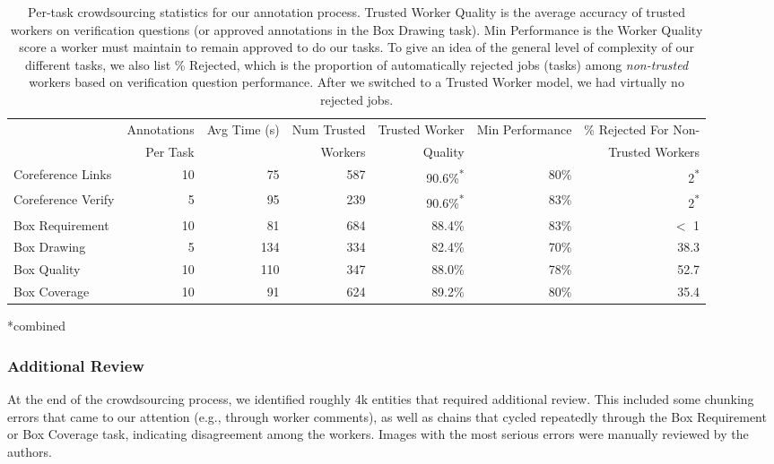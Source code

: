 \documentclass[twocolumn]{svjour3}
\begin{document}
\begin{table*}
\caption{Per-task crowdsourcing statistics for our annotation process.  Trusted Worker Quality is the average accuracy of trusted workers on verification questions (or approved annotations in the Box Drawing task). Min Performance is the Worker Quality score a worker must maintain to remain approved to do our tasks. To give an idea of the general level of complexity of our different tasks, we also list \% Rejected, which is the proportion of automatically rejected jobs (tasks) among {\em non-trusted} workers based on verification question performance. After we switched to a Trusted Worker model, we had virtually no rejected jobs.}
\label{table:annoStats}
\small
\begin{center}
\begin{tabular}{|l|r|r|r|r|r|r|}
\hline
& Annotations& \multirow{2}{*}{Avg Time (s)} & Num Trusted & Trusted Worker & \multirow{2}{*}{Min Performance} & \% Rejected For Non-\\
& Per Task & & Workers  & Quality & & Trusted Workers\\
\hline
Coreference Links & 10 & 75 & 587 & 90.6\%\textsuperscript{*} & 80\% & 2\textsuperscript{*}\\
Coreference Verify & 5 & 95 & 239 & 90.6\%\textsuperscript{*} & 83\% & 2\textsuperscript{*}\\
Box Requirement & 10 & 81 & 684 & 88.4\% & 83\% & $<$ 1\\
Box Drawing & 5 & 134 & 334 & 82.4\% & 70\% & 38.3\\
Box Quality & 10 & 110 & 347 & 88.0\% & 78\% & 52.7\\
Box Coverage & 10 & 91 & 624 & 89.2\% & 80\% & 35.4\\
\hline
\end{tabular}
\vspace{-1.5mm}
\flushleft\hspace{5mm}\begingroup
    \fontsize{6pt}{6pt}\selectfont
 *combined
\endgroup
\vspace{-3mm}
\end{center}
\end{table*}

\subsubsection{Additional Review}
At the end of the crowdsourcing process, we identified roughly 4k entities that required additional review. This included some chunking errors that came to our attention (e.g., through worker comments), as well as chains that cycled repeatedly through the Box Requirement or Box Coverage task, indicating disagreement among the workers. Images with the most serious errors were manually reviewed by the authors.
\end{document}
